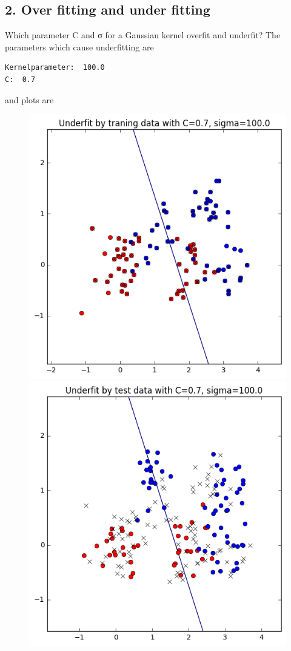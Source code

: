 \documentclass[a4paper,11pt]{article}
\begin{document}
\subsection*{2. Over fitting and under fitting}
Which parameter C and σ for a Gaussian kernel overfit and underfit?
The parameters which cause underfitting are

\begin{verbatim}
Kernelparameter:  100.0
C:  0.7
\end{verbatim}

and plots are

\begin{figure}[htbp]
  \includegraphics[scale=0.5]{smouftr.png}
  \includegraphics[scale=0.5]{smoufte.png}
\end{figure}
\end{document}
